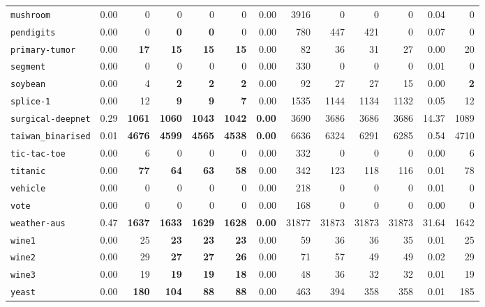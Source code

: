 \begin{tabular}{lrrrrrrrrrrrr}
\texttt{mushroom} & 0.00 & 0 & 0 & 0 & 0 & 0.00 & 3916 & 0 & 0 & 0 & 0.04 & 0\\
\texttt{pendigits} & 0.00 & 0 & \textbf{0} & \textbf{0} & 0 & 0.00 & 780 & 447 & 421 & 0 & 0.07 & 0\\
\texttt{primary-tumor} & 0.00 & \textbf{17} & \textbf{15} & \textbf{15} & \textbf{15} & 0.00 & 82 & 36 & 31 & 27 & 0.00 & 20\\
\texttt{segment} & 0.00 & 0 & 0 & 0 & 0 & 0.00 & 330 & 0 & 0 & 0 & 0.01 & 0\\
\texttt{soybean} & 0.00 & 4 & \textbf{2} & \textbf{2} & \textbf{2} & 0.00 & 92 & 27 & 27 & 15 & 0.00 & \textbf{2}\\
\texttt{splice-1} & 0.00 & 12 & \textbf{9} & \textbf{9} & \textbf{7} & 0.00 & 1535 & 1144 & 1134 & 1132 & 0.05 & 12\\
\texttt{surgical-deepnet} & 0.29 & \textbf{1061} & \textbf{1060} & \textbf{1043} & \textbf{1042} & \textbf{0.00} & 3690 & 3686 & 3686 & 3686 & 14.37 & 1089\\
\texttt{taiwan\_binarised} & 0.01 & \textbf{4676} & \textbf{4599} & \textbf{4565} & \textbf{4538} & \textbf{0.00} & 6636 & 6324 & 6291 & 6285 & 0.54 & 4710\\
\texttt{tic-tac-toe} & 0.00 & 6 & 0 & 0 & 0 & 0.00 & 332 & 0 & 0 & 0 & 0.00 & 6\\
\texttt{titanic} & 0.00 & \textbf{77} & \textbf{64} & \textbf{63} & \textbf{58} & 0.00 & 342 & 123 & 118 & 116 & 0.01 & 78\\
\texttt{vehicle} & 0.00 & 0 & 0 & 0 & 0 & 0.00 & 218 & 0 & 0 & 0 & 0.01 & 0\\
\texttt{vote} & 0.00 & 0 & 0 & 0 & 0 & 0.00 & 168 & 0 & 0 & 0 & 0.00 & 0\\
\texttt{weather-aus} & 0.47 & \textbf{1637} & \textbf{1633} & \textbf{1629} & \textbf{1628} & \textbf{0.00} & 31877 & 31873 & 31873 & 31873 & 31.64 & 1642\\
\texttt{wine1} & 0.00 & 25 & \textbf{23} & \textbf{23} & \textbf{23} & 0.00 & 59 & 36 & 36 & 35 & 0.01 & 25\\
\texttt{wine2} & 0.00 & 29 & \textbf{27} & \textbf{27} & \textbf{26} & 0.00 & 71 & 57 & 49 & 49 & 0.02 & 29\\
\texttt{wine3} & 0.00 & 19 & \textbf{19} & \textbf{19} & \textbf{18} & 0.00 & 48 & 36 & 32 & 32 & 0.01 & 19\\
\texttt{yeast} & 0.00 & \textbf{180} & \textbf{104} & \textbf{88} & \textbf{88} & 0.00 & 463 & 394 & 358 & 358 & 0.01 & 185\\
\bottomrule
\end{tabular}
